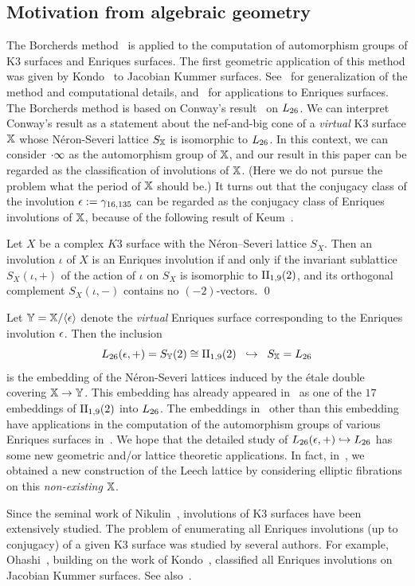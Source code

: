 \documentclass{amsart} %
\begin{document}
\subsection{Motivation from algebraic geometry}\label{subsec:alggeom}
%
The Borcherds method~\cite{MR913200, MR1654763}
is applied to the computation of automorphism groups of K3 surfaces and Enriques surfaces.
The first geometric application of this method was given 
by Kondo~\cite{MR1618132} to Jacobian Kummer surfaces.
See~\cite{MR3456710, MR4759604} for generalization of the method and computational details,
and~\cite{MR4498439, MR4389670} for applications to Enriques surfaces.
The Borcherds method is based on Conway's result~\cite{MR690711} on $L_{26}$. 
We can interpret Conway's result 
as a statement about the nef-and-big cone of a \emph{virtual} K3 surface $\mathord{\mathbb{X}}$
 whose N\'eron-Severi lattice $S_{\mathord{\mathbb{X}}}$ is isomorphic to $L_{26}$.
In this context, we can consider $\cdot \infty$ as 
the automorphism group of $\mathord{\mathbb{X}}$,
and our result in this paper can be regarded as the classification of involutions of $\mathord{\mathbb{X}}$.
(Here we do not pursue the problem what the period of $\mathord{\mathbb{X}}$ should be.)
It turns out that 
the conjugacy class of the involution $\epsilon:=\gamma_{16, 135}$ can be regarded 
 as the conjugacy class of Enriques involutions of $\mathord{\mathbb{X}}$,
 because of the following result of Keum~\cite{MR1060704}.
 \begin{proposition}
 Let $X$ be a complex $K3$ surface
with the N\'eron--Severi lattice $S_X$.
 Then an involution $\iota$ of $X$ is an Enriques involution
 if and only if the invariant sublattice $S_X(\iota, +)$ of 
 the action of $\iota$ on $S_X$ 
 is isomorphic to $\mathrm{II}_{1,9} (2)$,
 and its orthogonal complement $S_X(\iota, -)$
contains no $(-2)$-vectors.
 \qed
 \end{proposition}
%
Let $\mathord{\mathbb{Y}}=\mathord{\mathbb{X}}/\langle {\epsilon} \rangle$ denote the \emph{virtual} Enriques surface
corresponding to the Enriques involution $\epsilon$.
Then the inclusion 
\[
L_{26}(\epsilon, +)=S_{\mathord{\mathbb{Y}}}(2)\cong \mathrm{II}_{1,9} (2)\;\; \hookrightarrow \;\;S_{\mathord{\mathbb{X}}}=L_{26}
\]
is the embedding of the N\'eron-Severi lattices
induced by the \'etale double covering $\mathord{\mathbb{X}}\to \mathord{\mathbb{Y}}$.
This embedding 
has already appeared in~\cite{MR4389670} as one of the $17$ embeddings 
of $\mathrm{II}_{1,9} (2)$ into $L_{26}$.
The embeddings in~\cite{MR4389670} other than this embedding 
have applications in the computation of the automorphism groups
of various Enriques surfaces in~\cite{MR4498439}.
We hope that the detailed study of $L_{26}(\epsilon, +)\hookrightarrow L_{26}$
has some new geometric and/or lattice theoretic applications.
In fact,
in~\cite{MR4674939}, 
we obtained a new construction of the Leech lattice
by considering elliptic fibrations on this \emph{non-existing} $\mathord{\mathbb{X}}$.
%
\par
Since the seminal work of Nikulin~\cite{MR633160}, 
involutions of K3 surfaces have been extensively studied.
The problem of enumerating all Enriques involutions 
(up to conjugacy) of a given K3 surface was
studied by several authors.
For example, Ohashi~\cite{MR2552959},
building on the work of Kondo~\cite{MR1618132}, 
 classified all Enriques involutions on Jacobian Kummer surfaces. 
 See also~\cite{MR4288644}.
%
%
\end{document}
